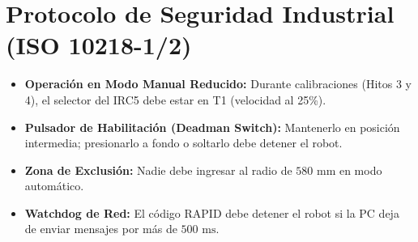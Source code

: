 \documentclass[11pt,a4paper]{article}
\begin{document}
\section{Protocolo de Seguridad Industrial (ISO 10218-1/2)}
\begin{itemize}
    \item \textbf{Operación en Modo Manual Reducido:} Durante calibraciones (Hitos 3 y 4), el selector del IRC5 debe estar en T1 (velocidad al 25\%).
    \item \textbf{Pulsador de Habilitación (Deadman Switch):} Mantenerlo en posición intermedia; presionarlo a fondo o soltarlo debe detener el robot.
    \item \textbf{Zona de Exclusión:} Nadie debe ingresar al radio de $580\text{ mm}$ en modo automático.
    \item \textbf{Watchdog de Red:} El código RAPID debe detener el robot si la PC deja de enviar mensajes por más de $500\text{ ms}$.
\end{itemize}
\end{document}
